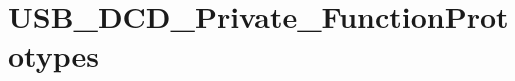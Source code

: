 \hypertarget{group___u_s_b___d_c_d___private___function_prototypes}{\section{U\-S\-B\-\_\-\-D\-C\-D\-\_\-\-Private\-\_\-\-Function\-Prototypes}
\label{group___u_s_b___d_c_d___private___function_prototypes}
}
